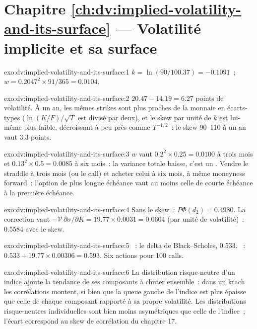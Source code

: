 \section*{Chapitre \ref{ch:dv:implied-volatility-and-its-surface} --- Volatilité implicite et sa surface}

\begin{solution}{exo:dv:implied-volatility-and-its-surface:1}
$k=\ln(90/100.37)=-0.1091$~; $w=0.2047^2\times91/365=0.0104$.
\end{solution}

\begin{solution}{exo:dv:implied-volatility-and-its-surface:2}
$20.47-14.19=6.27$ points de volatilité. À un an, les mêmes strikes sont plus proches de la monnaie en
écarts-types ($\ln(K/F)/\sqrt T$ est divisé par deux), et le skew par unité de $k$ est lui-même
plus faible, décroissant à peu près comme $T^{-1/2}$~: le skew 90--110 à un an vaut 3.3 points.
\end{solution}

\begin{solution}{exo:dv:implied-volatility-and-its-surface:3}
$w$ vaut $0.2^2\times0.25=0.0100$ à trois mois et $0.13^2\times0.5=0.0085$ à six mois~: la
variance totale baisse, c'est un . Vendre le straddle à trois mois (ou le call) et acheter
celui à six mois, à même moneyness forward~: l'option de plus longue échéance vaut au moins
celle de courte échéance à la première échéance.
\end{solution}

\begin{solution}{exo:dv:implied-volatility-and-its-surface:4}
Sans le skew~: $P\Phi(d_2)=0.4980$. La correction vaut $-\mathcal V\,\partial\sigma/\partial K
=19.77\times0.0031=0.0604$ (par unité de volatilité)~: 0.5584 avec le skew.
\end{solution}

\begin{solution}{exo:dv:implied-volatility-and-its-surface:5}
~: le delta de Black--Scholes, 0.533. ~: $0.533+19.77\times0.00306=0.593$.
Six actions pour 100 calls.
\end{solution}

\begin{solution}{exo:dv:implied-volatility-and-its-surface:6}
La distribution risque-neutre d'un indice ajoute la tendance de ses composants à chuter ensemble~: dans un krach
les corrélations montent, si bien que la queue gauche de l'indice est plus épaisse que celle de chaque
composant rapporté à sa propre volatilité. Les distributions risque-neutres individuelles sont bien moins asymétriques que
celle de l'indice~; l'écart correspond au skew de corrélation du chapitre 17.
\end{solution}

